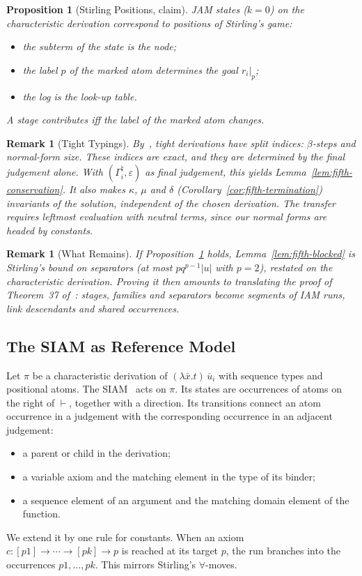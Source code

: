 \documentclass[10pt,a4paper]{article}
\theoremstyle{plain}%
\newtheorem{proposition}[theorem]{Proposition}
\newtheorem{remark}[theorem]{Remark}
\begin{document}
\begin{proposition}[Stirling Positions, claim]\label{prop:fifth-positions}
JAM states ($k = 0$) on the characteristic derivation correspond to positions of Stirling's game:
\begin{itemize}
\item the subterm of the state is the node;
\item the label $p$ of the marked atom determines the goal $r_i|_p$;
\item the log is the look-up table.
\end{itemize}
A stage contributes iff the label of the marked atom changes.
\end{proposition}

\begin{remark}[Tight Typings]
By~\cite{AccattoliGK18}, tight derivations have split indices: $\beta$-steps and normal-form size.
These indices are exact, and they are determined by the final judgement alone.
With $(\Gamma_i^\natural, \varepsilon)$ as final judgement, this yields Lemma~\ref{lem:fifth-conservation}.
It also makes $\kappa$, $\mu$ and $\delta$ (Corollary~\ref{cor:fifth-termination}) invariants of the solution, independent of the chosen derivation.
The transfer requires leftmost evaluation with neutral terms, since our normal forms are headed by constants.
\end{remark}

\begin{remark}[What Remains]
If Proposition~\ref{prop:fifth-positions} holds, Lemma~\ref{lem:fifth-blocked} is Stirling's bound on separators (at most $pq^{p-1}|u|$ with $p = 2$), restated on the characteristic derivation.
Proving it then amounts to translating the proof of Theorem~37 of~\cite{stirling2009}: stages, families and separators become segments of IAM runs, link descendants and shared occurrences.
\end{remark}

\subsection{The SIAM as Reference Model}
\label{sec:fifth-siam}

Let $\pi$ be a characteristic derivation of $(\lambda\bar x.t)\,\bar u_i$ with sequence types and positional atoms.
The SIAM~\cite{AccattoliDLV21} acts on $\pi$.
Its states are occurrences of atoms on the right of $\vdash$, together with a direction.
Its transitions connect an atom occurrence in a judgement with the corresponding occurrence in an adjacent judgement:
\begin{itemize}
\item a parent or child in the derivation;
\item a variable axiom and the matching element in the type of its binder;
\item a sequence element of an argument and the matching domain element of the function.
\end{itemize}
We extend it by one rule for constants.
When an axiom $c : [p1] \to \cdots \to [pk] \to p$ is reached at its target $p$, the run branches into the occurrences $p1, \ldots, pk$.
This mirrors Stirling's $\forall$-moves.
\end{document}
